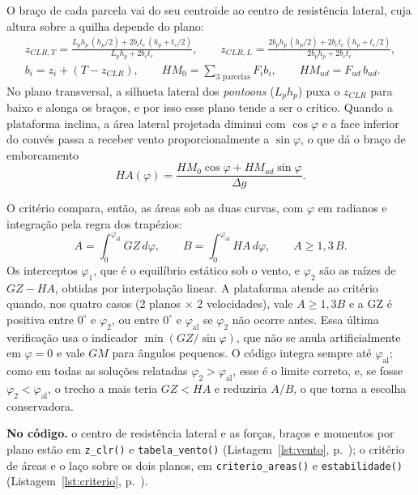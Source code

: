 \documentclass[11pt,a4paper]{article}
\newcommand{\notacodigo}[1]{\begin{nocodigo}\textbf{\sffamily\color{azul}No código.} #1\end{nocodigo}}
\newcommand{\lst}[1]{Listagem~\ref{lst:#1}, p.~\pageref{lst:#1}}
\newcommand{\phial}{\varphi_{\mathrm{al}}}
\begin{document}
O braço de cada parcela vai do seu centroide ao centro de resistência lateral, cuja altura sobre a
quilha depende do plano:
\begin{gather}
z_{CLR,T} = \frac{L_p h_p \,(h_p/2) + 2 b_c t_c\,(h_p + t_c/2)}{L_p h_p + 2 b_c t_c}, \qquad
z_{CLR,L} = \frac{2 b_p h_p \,(h_p/2) + 2 b_c t_c\,(h_p + t_c/2)}{2 b_p h_p + 2 b_c t_c}, \\
b_i = z_i + (T - z_{CLR}), \qquad HM_0 = \sum_{\text{3 parcelas}} F_i b_i, \qquad HM_{ud} = F_{ud}\, b_{ud}.
\end{gather}
No plano transversal, a silhueta lateral dos \emph{pontoons} ($L_p h_p$) puxa o $z_{CLR}$ para
baixo e alonga os braços, e por isso esse plano tende a ser o crítico. Quando a plataforma inclina,
a área lateral projetada diminui com $\cos\varphi$ e a face inferior do convés passa a receber
vento proporcionalmente a $\sin\varphi$, o que dá o braço de emborcamento
\begin{equation}
HA(\varphi) = \frac{HM_0\cos\varphi + HM_{ud}\sin\varphi}{\Delta g} .
\end{equation}

O critério compara, então, as áreas sob as duas curvas, com $\varphi$ em radianos e integração
pela regra dos trapézios:
\begin{equation}
A = \int_0^{\phial} GZ\, d\varphi, \qquad B = \int_0^{\phial} HA\, d\varphi, \qquad A \ge 1{,}3\,B .
\end{equation}
Os interceptos $\varphi_1$, que é o equilíbrio estático sob o vento, e $\varphi_2$ são as raízes
de $GZ - HA$, obtidas por interpolação linear. A plataforma atende ao critério quando, nos quatro
casos (2 planos $\times$ 2 velocidades), vale $A \ge 1{,}3B$ e a GZ é positiva entre $0^\circ$ e
$\varphi_2$, ou entre $0^\circ$ e $\phial$ se $\varphi_2$ não ocorre antes. Essa última
verificação usa o indicador $\min(GZ/\sin\varphi)$, que não se anula artificialmente em
$\varphi = 0$ e vale $GM$ para ângulos pequenos. O código integra sempre até $\phial$; como em
todas as soluções relatadas $\varphi_2 > \phial$, esse é o limite correto, e, se fosse
$\varphi_2 < \phial$, o trecho a mais teria $GZ < HA$ e reduziria $A/B$, o que torna a escolha
conservadora.

\notacodigo{o centro de resistência lateral e as forças, braços e momentos por plano estão em
\texttt{z\_clr()} e \texttt{tabela\_vento()} (\lst{vento}); o critério de áreas e o laço sobre os
dois planos, em \texttt{criterio\_areas()} e \texttt{estabilidade()} (\lst{criterio}).}
\end{document}
